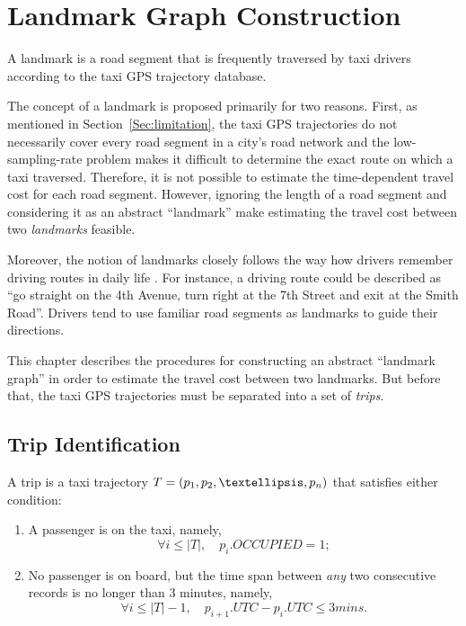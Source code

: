 \chapter{Landmark Graph Construction}\label{Chap:3}
\begin{defn}\label{Def:ldmk}
A landmark is a road segment that is frequently traversed by taxi drivers according to the taxi GPS trajectory database. \cite{TDR10}
\end{defn}

The concept of a landmark is proposed primarily for two reasons. First, as mentioned in Section~\ref{Sec:limitation}, the taxi GPS trajectories do not necessarily cover every road segment in a city's road network and the low-sampling-rate problem makes it difficult to determine the exact route on which a taxi traversed. Therefore, it is not possible to estimate the time-dependent travel cost for each road segment. However, ignoring the length of a road segment and considering it as an abstract ``landmark'' make estimating the travel cost between two \emph{landmarks} feasible. 

Moreover, the notion of landmarks closely follows the way how drivers remember driving routes in daily life \cite{TDR10}. For instance, a driving route could be described as ``go straight on the 4th Avenue, turn right at the 7th Street and exit at the Smith Road''. Drivers tend to use familiar road segments as landmarks to guide their directions.

This chapter describes the procedures for constructing an abstract ``landmark graph'' in order to estimate the travel cost between two landmarks. But before that, the taxi GPS trajectories must be separated into a set of \emph{trips}.

\section{Trip Identification}
\begin{defn}\label{Def:trip}
A trip is a taxi trajectory $T = (p_1,p_2,\textellipsis,p_n)$ that satisfies either condition:
\begin{enumerate}
\item A passenger is on the taxi, namely, 
\begin{equation}
\forall i \leq |T|, \quad p_{i}.OCCUPIED = 1;
\end{equation}
\item No passenger is on board, but the time span between \emph{any} two consecutive records is no longer than 3 minutes, namely, 
\begin{equation}
\forall i \leq |T| - 1, \quad p_{i + 1}.UTC - p_{i}.UTC \leq 3 mins.
\end{equation}
\end{enumerate}
\end{defn}

